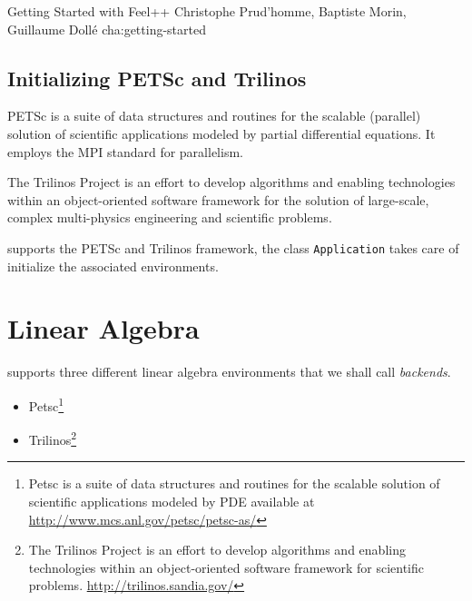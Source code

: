             {Getting Started with Feel++}
            {Christophe Prud'homme, Baptiste Morin, Guillaume Dollé}
            {cha:getting-started}





\subsection{Initializing PETSc and Trilinos}


PETSc is a suite of data structures and routines for the scalable (parallel)
solution of scientific applications modeled by partial differential
equations. It employs the MPI standard for parallelism.

The Trilinos Project is an effort to develop algorithms and enabling
technologies within an object-oriented software framework for the solution of
large-scale, complex multi-physics engineering and scientific problems.

\feel supports the PETSc and Trilinos framework, the class
\lstinline!Application! takes care of initialize the
associated environments.









\section{Linear Algebra}
\label{sec:linear-algebra}

\feel supports three different linear algebra environments that we
shall call \emph{backends}.
\begin{itemize}
\item Petsc\footnote{Petsc is a suite of data structures and routines for the scalable solution of scientific applications modeled by PDE available at \url{http://www.mcs.anl.gov/petsc/petsc-as/}}
\item Trilinos\footnote{The Trilinos Project is an effort to develop algorithms and enabling technologies within an object-oriented software framework for scientific problems. \url{http://trilinos.sandia.gov/}}
\end{itemize}


